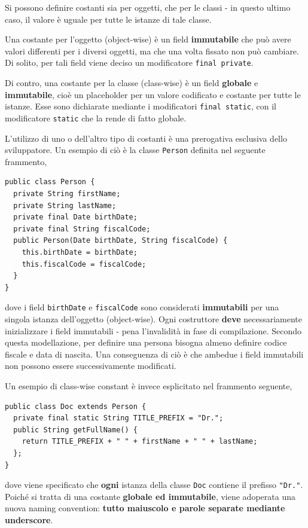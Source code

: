 \documentclass[\fontsizeclass,twocolumn]{\classname}
\theoremstyle{definition}
\theoremstyle{definition}
\begin{document}
Si possono definire costanti sia per oggetti, che per le classi \-- in questo
ultimo caso, il valore è uguale per tutte le istanze di tale classe.

Una costante per l'oggetto (object-wise) è un field \textbf{immutabile} che può avere valori
differenti per i diversi oggetti, ma che una volta fissato non può cambiare. Di
solito, per tali field viene deciso un modificatore \texttt{final private}.

Di contro, una costante per la classe (class-wise) è un field
\textbf{globale} e \textbf{immutabile}, cioè un placeholder per un valore
codificato e costante per tutte le istanze. Esse sono dichiarate mediante i
modificatori \texttt{final static}, con il modificatore \texttt{static} che la
rende di fatto globale.

L'utilizzo di uno o dell'altro tipo di costanti è una prerogativa esclusiva
dello sviluppatore. Un esempio di ciò è la classe \texttt{Person} definita nel
seguente frammento,

\begin{lstlisting}
public class Person {
  private String firstName;
  private String lastName;
  private final Date birthDate;
  private final String fiscalCode;
  public Person(Date birthDate, String fiscalCode) {
    this.birthDate = birthDate;
    this.fiscalCode = fiscalCode;
  }
}
\end{lstlisting}

dove i field \texttt{birthDate} e \texttt{fiscalCode} sono considerati
\textbf{immutabili} per una singola istanza dell'oggetto (object-wise). Ogni
costruttore \textbf{deve} necessariamente inizializzare i field immutabili \--
pena l'invalidità in fase di compilazione. Secondo questa modellazione, per
definire una persona bisogna almeno definire codice fiscale e data di nascita.
Una conseguenza di ciò è che ambedue i field immutabili non possono essere
successivamente modificati.

Un esempio di class-wise constant è invece esplicitato nel frammento seguente,

\begin{lstlisting}
public class Doc extends Person {
  private final static String TITLE_PREFIX = "Dr.";
  public String getFullName() {
    return TITLE_PREFIX + " " + firstName + " " + lastName;
  };
}
\end{lstlisting}

dove viene specificato che \textbf{ogni} istanza della classe \texttt{Doc}
contiene il prefisso \texttt{"Dr."}. Poiché si tratta di una costante
\textbf{globale ed immutabile}, viene adoperata una nuova naming convention:
\textbf{tutto maiuscolo e parole separate mediante underscore}.
\end{document}
